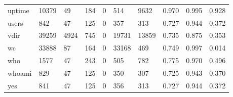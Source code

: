 \begin{longtable}{lp{1.3cm}p{1.3cm}p{1.3cm}p{1.3cm}p{1.3cm}p{1.3cm}p{1.3cm}p{1.3cm}p{1.3cm}}
uptime    &                  10379 &                                 49 &                               184 &                                0 &                               514 &                            9632 &                                   0.970 &                                  0.995 &                                0.928 \\
users     &                    842 &                                 47 &                               125 &                                0 &                               357 &                             313 &                                   0.727 &                                  0.944 &                                0.372 \\
vdir      &                  39259 &                               4924 &                               745 &                                0 &                             19731 &                           13859 &                                   0.735 &                                  0.875 &                                0.353 \\
wc        &                  33888 &                                 87 &                               164 &                                0 &                             33168 &                             469 &                                   0.749 &                                  0.997 &                                0.014 \\
who       &                   1577 &                                 47 &                               243 &                                0 &                               505 &                             782 &                                   0.775 &                                  0.970 &                                0.496 \\
whoami    &                    829 &                                 47 &                               125 &                                0 &                               350 &                             307 &                                   0.725 &                                  0.943 &                                0.370 \\
yes       &                    841 &                                 47 &                               125 &                                0 &                               356 &                             313 &                                   0.727 &                                  0.944 &                                0.372 \\
\end{longtable}

